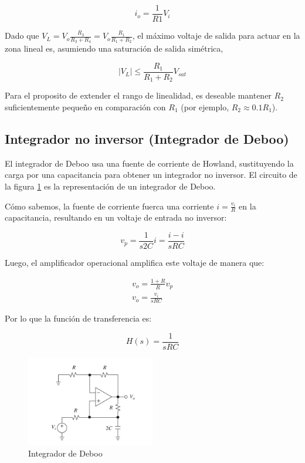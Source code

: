\begin{equation}
    \boxed{i_o = \frac{1}{R1} V_i}
    \label{eq:mt-io-fuente-corriente}
\end{equation}

Dado que $V_L = V_o \frac{R_3}{R_3 + R_4} = V_o \frac{R_1}{R_1 + R_2}$, el máximo  voltaje de salida para actuar en la zona lineal es, asumiendo una saturación de salida simétrica,  

\begin{equation}
    \left| V_L \right| \leq  \frac{R_1}{R_1 + R_2} V_{sat}
\end{equation}

Para el proposito de extender el rango de linealidad, es deseable mantener $R_2$ suficientemente pequeño en comparación	con $R_1$ (por ejemplo, $R_2 \approx 0.1 R_1$).

\subsection{Integrador no inversor (Integrador de Deboo)}

El integrador de Deboo usa una fuente de corriente de Howland, sustituyendo la carga por una capacitancia para obtener un integrador no inversor. El circuito de la figura \ref{fig:mt-integrador-deboo} es la representación de un integrador de Deboo.

Cómo sabemos, la fuente de corriente fuerca una corriente $i = \frac{v_i}{R}$ en la capacitancia, resultando en un voltaje de entrada no inversor:

\begin{equation*}
    v_p = \frac{1}{s2C} i = \frac{i-i}{sRC}
\end{equation*}

Luego, el amplificador operacional amplifica este voltaje de manera que:

\begin{align*}
    v_o = \frac{1 + R}{R} v_p \\
    v_o = \frac{v_i}{sRC}
\end{align*}

Por lo que la función de transferencia es: 

\begin{equation}
    H(s) = \frac{1}{sRC}
    \label{eq:mt-func-transferencia-integrador-deboo}
\end{equation}

\begin{figure}[ht]
    \centering
    \includegraphics[width=0.5\textwidth]{src/images/integrador-deboo.png}
    \caption{Integrador de Deboo}
    \label{fig:mt-integrador-deboo}
\end{figure}

